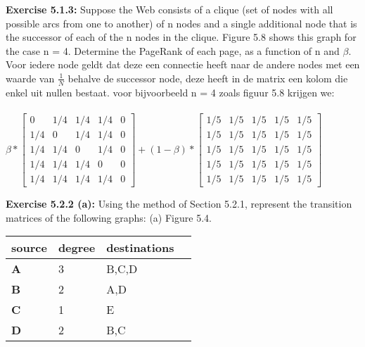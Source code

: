 \documentclass{exam}
\begin{document}
\begin{questions}
\question \textbf{Exercise 5.1.3:} Suppose the Web consists of a clique (set of nodes with all possible arcs from one to another) of n nodes and a single additional node that is the successor of each of the n nodes in the clique. Figure 5.8 shows this graph for the case n = 4. Determine the PageRank of each page, as a function of n and $\beta$.     \\
     
Voor iedere node geldt dat deze een connectie heeft naar de andere nodes met een waarde van $\frac{1}{N}$ behalve de successor node, deze heeft in de matrix een kolom die enkel uit nullen bestaat.
voor bijvoorbeeld n = 4 zoals figuur 5.8 krijgen we:\\\\
$ \beta * \begin{bmatrix}0 & 1/4 & 1/4 & 1/4 & 0\\ 
1/4 & 0 & 1/4 & 1/4 & 0\\ 
1/4 & 1/4 & 0& 1/4 & 0\\ 
1/4 & 1/4 & 1/4 & 0& 0\\ 
1/4 & 1/4 & 1/4 & 1/4 & 0 \end{bmatrix} + (1 - \beta) * \begin{bmatrix}1/5 & 1/5 & 1/5 & 1/5 & 1/5\\ 
1/5 & 1/5 & 1/5 & 1/5 &  1/5\\ 
1/5 & 1/5 & 1/5 & 1/5 &  1/5\\ 
1/5 & 1/5 & 1/5 & 1/5 &  1/5\\ 
1/5 & 1/5 & 1/5 & 1/5 &  1/5 \end{bmatrix}$


\question \textbf{Exercise 5.2.2 (a):} Using the method of Section 5.2.1, represent the transition matrices of the following graphs: (a) Figure 5.4.  \\ 

\begin{tabular}{ | l | l | l | l |}
    \hline
    \textbf{source} & \textbf{degree} & \textbf{destinations} \\ \hline
    \textbf{A} & 3 & B,C,D \\ \hline
    \textbf{B} & 2 &  A,D \\ \hline
    \textbf{C} & 1 & E \\ \hline
      \textbf{D} & 2 & B,C  \\
    \hline
    \end{tabular}
    

\end{questions}
\end{document}

